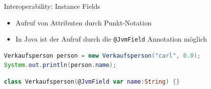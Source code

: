 \documentclass{beamer}
\begin{document}
\begin{frame}[fragile]{Interoperability: Instance Fields}
  \begin{itemize}[<+->]
    \item Aufruf von Attributen durch Punkt-Notation
    \item In Java ist der Aufruf durch die \texttt{@JvmField} Annotation möglich
  \end{itemize}
  \pause
  \begin{lstlisting}[language=Java]
Verkaufsperson person = new Verkaufsperson("carl", 0.0);
System.out.println(person.name);
  \end{lstlisting}
  \pause
  \begin{lstlisting}[language=Kotlin]
class Verkaufsperson(@JvmField var name:String) {}
  \end{lstlisting}
\end{frame}
\end{document}
